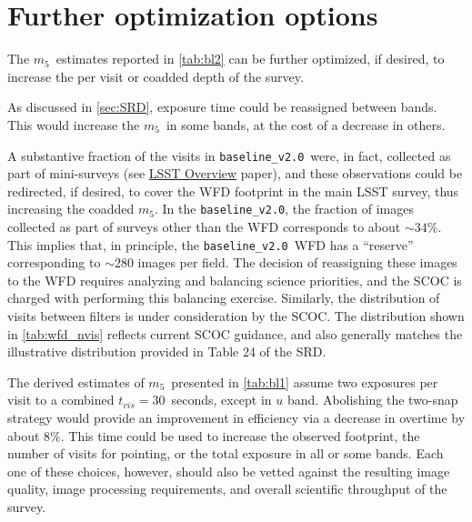 \documentclass[PST,authoryear,toc]{lsstdoc}
\newcommand{\mf}{\ensuremath{m_5}}
\newcommand{\baseline}{\texttt{baseline\_v2.0}}
\begin{document}
\FloatBarrier


 
\section{Further optimization options}\label{sec:optimize}

The \mf\ estimates reported in \autoref{tab:bl2} can be further optimized, if desired, to increase the per visit or coadded depth of the survey. 

 
  
 As discussed in \autoref{sec:SRD}, exposure time could be reassigned between
bands. This would increase the \mf\ in some bands, at the cost of a decrease in others.
 
 A substantive fraction of the visits in \baseline\ were, in fact, collected as part of mini-surveys (see  \href{https://ls.st/lop}{{LSST Overview}} paper), and these observations could be redirected, if desired, to cover the WFD footprint in the main LSST survey, thus increasing the coadded \mf. In the \baseline, the fraction of images collected as part of surveys other than the WFD corresponds to about  $\sim34\%$. This implies that, in principle, the \baseline\ WFD has a ``reserve'' corresponding to $\sim280$ images per field.  The decision of reassigning these images to the WFD requires analyzing and balancing  science priorities, and the SCOC is charged with performing this balancing exercise. Similarly, the distribution of visits between filters is under consideration by the SCOC.  The distribution shown in \autoref{tab:wfd_nvis} reflects current SCOC guidance, and also generally matches the illustrative distribution provided in Table 24 of the SRD. 

 
The derived estimates of \mf\ presented in \autoref{tab:bl1} assume two exposures per visit to a combined $t_{vis}=30$~seconds, except in $u$ band. Abolishing the two-snap strategy would provide an improvement in efficiency via a decrease in overtime by about 8\%. This time could be used to increase the observed footprint, the number of visits for pointing, or the total exposure in all or some bands. Each one of these choices, however, should also be vetted against the resulting image quality, image processing requirements, and overall scientific throughput of the survey. 
 
\end{document}
